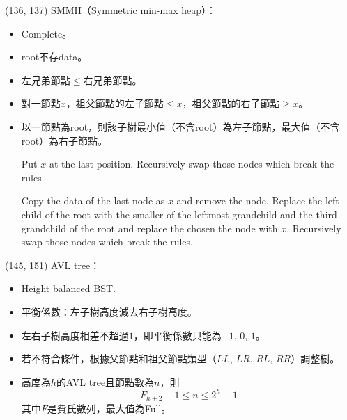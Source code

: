 \item \begin{theorem}{(136, 137)} SMMH（Symmetric min-max heap）： \label{smmh}\begin{itemize}
        \item Complete。
        \item root不存data。
        \item 左兄弟節點$\le$右兄弟節點。
        \item 對一節點$x$，祖父節點的左子節點$\le x$，祖父節點的右子節點$\ge x$。
        \item 以一節點為root，則該子樹最小值（不含root）為左子節點，最大值（不含root）為右子節點。
        \begin{algorithm}[H]
            \begin{algorithmic}[1]
                    \State Put $x$ at the last position.
                    \State Recursively swap those nodes which break the rules.
                \EndFunction
            \end{algorithmic}
        \end{algorithm}
        \begin{algorithm}[H]
            \begin{algorithmic}[1]
                    \State Copy the data of the last node as $x$ and remove the node.
                    \State Replace the left child of the root with the smaller of the leftmost grandchild and the third grandchild of the root and replace the chosen the node with $x$.
                    \State Recursively swap those nodes which break the rules.
                \EndFunction
            \end{algorithmic}
        \end{algorithm}
    \end{itemize}
\end{theorem}

\item \begin{theorem}{(145, 151)} AVL tree： \label{avltree}\begin{itemize}
        \item Height balanced BST.
        \item 平衡係數：左子樹高度減去右子樹高度。
        \item 左右子樹高度相差不超過$1$，即平衡係數只能為$-1$, $0$, $1$。
        \item 若不符合條件，根據父節點和祖父節點類型（$LL$, $LR$, $RL$, $RR$）調整樹。
        \item 高度為$h$的AVL tree且節點數為$n$，則\begin{equation}
            F_{h + 2} - 1 \le n \le 2^h - 1
        \end{equation} 其中$F$是費氏數列，最大值為Full。 
    \end{itemize}
\end{theorem}

